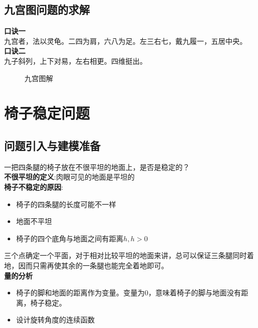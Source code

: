 \documentclass[openany]{progbookcn}
\begin{document}
\subsection{九宫图问题的求解}
\textbf{口诀一}\\
\indent 九宫者，法以灵龟。二四为肩，六八为足。左三右七，戴九履一，五居中央。\\
\indent \textbf{口诀二}\\
\indent 九子斜列，上下对易，左右相更。四维挺出。
\begin{figure}[H]
\centering
{}
\caption{九宫图解}
\end{figure}

\section{椅子稳定问题}
\subsection{问题引入与建模准备}
一把四条腿的椅子放在不很平坦的地面上，是否是稳定的？\\
\indent \textbf{不很平坦的定义}:肉眼可见的地面是平坦的\\
\textbf{椅子不稳定的原因}:
\begin{itemize}
\item 椅子的四条腿的长度可能不一样
\item 地面不平坦
\item 椅子的四个底角与地面之间有距离$h,h>0$
\end{itemize}
\indent 三个点确定一个平面，对于相对比较平坦的地面来讲，总可以保证三条腿同时着地，因而只需再使其余的一条腿也能完全着地即可。\\ 
\textbf{量的分析}
\begin{itemize}
\item 椅子的脚和地面的距离作为变量。变量为$0$，意味着椅子的脚与地面没有距离，椅子稳定。
\item 设计旋转角度的连续函数
\end{itemize}
\end{document}
